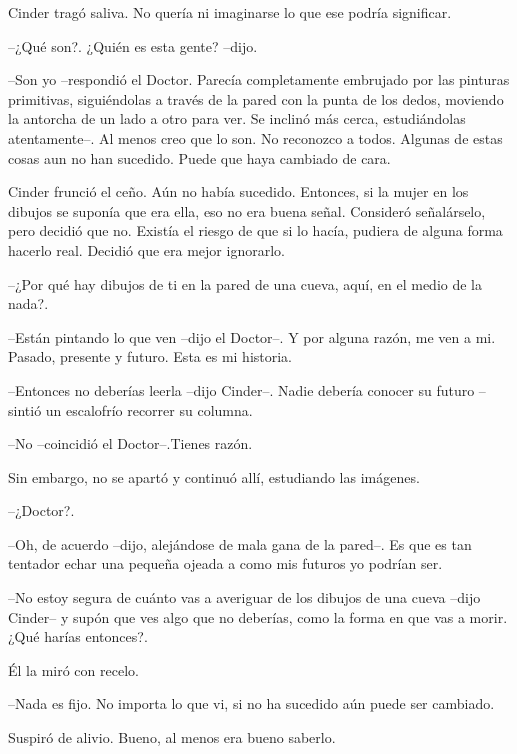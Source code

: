 Cinder tragó saliva. No quería ni imaginarse lo que ese podría significar. 



--¿Qué son?. ¿Quién es esta gente? --dijo.

--Son yo --respondió el Doctor. Parecía completamente embrujado por las pinturas primitivas, siguiéndolas a través de la pared con la punta de los dedos, moviendo la antorcha de un lado a otro para ver. Se inclinó más cerca, estudiándolas atentamente--. Al menos creo que lo son. No reconozco a todos. Algunas de estas cosas aun no han sucedido. Puede que haya cambiado de cara.



Cinder frunció el ceño. Aún no había sucedido. Entonces, si la mujer en los dibujos se suponía que era ella, eso no era buena señal. Consideró señalárselo, pero decidió que no. Existía el riesgo de que si lo hacía, pudiera de alguna forma hacerlo real. Decidió que era mejor ignorarlo. 



--¿Por qué hay dibujos de ti en la pared de una cueva, aquí, en el medio de la nada?.

--Están pintando lo que ven --dijo el Doctor--. Y por alguna razón, me ven a mi. Pasado, presente y futuro. Esta es mi historia.

--Entonces no deberías leerla --dijo Cinder--. Nadie debería conocer su futuro --sintió un escalofrío recorrer su columna.

--No --coincidió el Doctor--.Tienes razón. 



Sin embargo, no se apartó y continuó allí, estudiando las imágenes.



--¿Doctor?.

--Oh, de acuerdo --dijo, alejándose de mala gana de la pared--. Es que es tan tentador echar una pequeña ojeada a como mis futuros yo podrían ser.

--No estoy segura de cuánto vas a averiguar de los dibujos de una cueva --dijo Cinder-- y supón que ves algo que no deberías, como la forma en que vas a morir. ¿Qué harías entonces?.



Él la miró con recelo. 



--Nada es fijo. No importa lo que vi, si no ha sucedido aún puede ser cambiado.

Suspiró de alivio. Bueno, al menos era bueno saberlo. 



